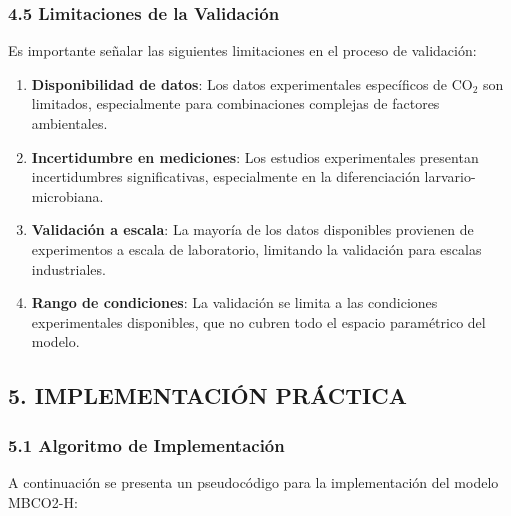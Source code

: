 \documentclass[
]{article}
\begin{document}
\subsubsection{4.5 Limitaciones de la
Validación}\label{limitaciones-de-la-validaciuxf3n}

Es importante señalar las siguientes limitaciones en el proceso de
validación:

\begin{enumerate}
\def\labelenumi{\arabic{enumi}.}
\item
  \textbf{Disponibilidad de datos}: Los datos experimentales específicos
  de CO$_2$ son limitados, especialmente para combinaciones complejas de
  factores ambientales.
\item
  \textbf{Incertidumbre en mediciones}: Los estudios experimentales
  presentan incertidumbres significativas, especialmente en la
  diferenciación larvario-microbiana.
\item
  \textbf{Validación a escala}: La mayoría de los datos disponibles
  provienen de experimentos a escala de laboratorio, limitando la
  validación para escalas industriales.
\item
  \textbf{Rango de condiciones}: La validación se limita a las
  condiciones experimentales disponibles, que no cubren todo el espacio
  paramétrico del modelo.
\end{enumerate}

\subsection{5. IMPLEMENTACIÓN
PRÁCTICA}\label{implementaciuxf3n-pruxe1ctica}

\subsubsection{5.1 Algoritmo de
Implementación}\label{algoritmo-de-implementaciuxf3n}

A continuación se presenta un pseudocódigo para la implementación del
modelo MBCO2-H:
\end{document}
